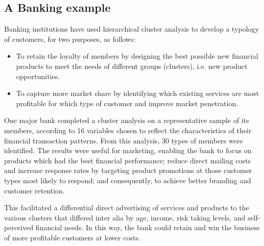 \documentclass[a4paper,12pt]{report}
\begin{document}
\subsection{A Banking example}
Banking institutions have used hierarchical cluster analysis to develop a typology of customers, for two purposes, as follows:
\begin{itemize}
	\item To retain the loyalty of members by designing the best possible new financial products to meet the needs of different groups (clusters), i.e. new product opportunities.
	\item To capture more market share by identifying which existing services are most profitable for which type of customer and improve market penetration.
\end{itemize}
One major bank completed a cluster analysis on a representative sample of its members, according to 16 variables chosen to reflect the characteristics of their financial transaction patterns. From this analysis, 30 types of members were identified. The results were useful for marketing, enabling the bank to focus on products which had the best financial performance; reduce direct mailing costs and increase response rates by targeting product promotions at those customer types most likely to respond; and consequently, to achieve better branding and customer retention.

This facilitated a differential direct advertising of services
and products to the various clusters that differed inter alia by age, income, risk taking levels, and self-perceived financial needs. In this way, the bank could retain and win the business of more profitable customers at lower costs.

\end{document}
